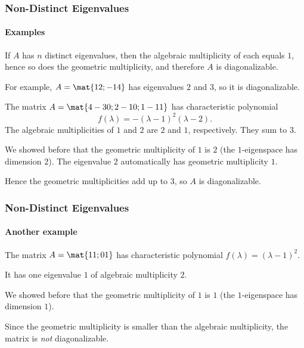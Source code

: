 \begin{frame}
\frametitle{Non-Distinct Eigenvalues}
\framesubtitle{Examples}

\vskip-3mm
\begin{eg}
  If $A$ has $n$ distinct eigenvalues, then the algebraic multiplicity of each
  equals $1$, hence so does the geometric multiplicity, and therefore $A$ is
  diagonalizable. 
  
  \pause\medskip
  For example, $A = \mat{1 2; -1 4}$ has eigenvalues $2$ and $3$, so it is
  diagonalizable.
\end{eg}

\pause\medskip
\begin{eg}
  The matrix $A = \mat{4 -3 0; 2 -1 0; 1 -1 1}$ has characteristic polynomial
  \[ f(\lambda) = -(\lambda-1)^2(\lambda-2). \]  
  \pause
  The algebraic multiplicities of $1$ and $2$ are $2$ and $1$, respectively.
  \pause
  They sum to $3$.

  \pause\smallskip
  We showed before that the geometric multiplicity of $1$ is $2$ (the
  $1$-eigenspace has dimension $2$).
  \pause
  The eigenvalue $2$ automatically has geometric multiplicity $1$.

  \pause\smallskip
  Hence the geometric multiplicities add up to $3$, so $A$ is diagonalizable.
\end{eg}

\end{frame}



\begin{frame}
\frametitle{Non-Distinct Eigenvalues}
\framesubtitle{Another example}

\vskip-3mm
\begin{eg}
  The matrix $A = \mat{1 1; 0 1}$ has characteristic polynomial
  $f(\lambda) = (\lambda-1)^2$.

  \pause\smallskip
  It has one eigenvalue $1$ of algebraic multiplicity $2$.

  \pause\smallskip
  We showed before that the geometric multiplicity of $1$ is $1$ (the
  $1$-eigenspace has dimension $1$).

  \pause\smallskip
  Since the geometric multiplicity is smaller than the algebraic multiplicity,
  the matrix is \emph{not} diagonalizable.
\end{eg}

\end{frame}



